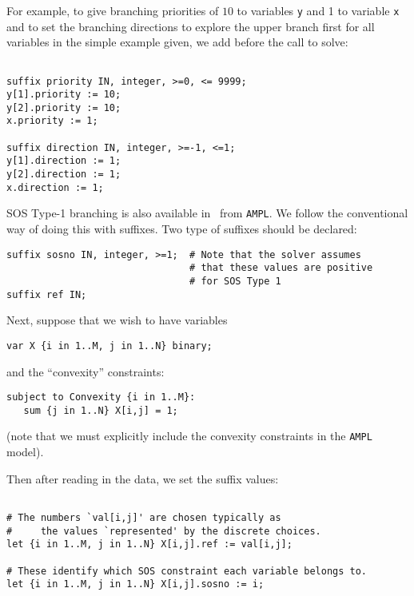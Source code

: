 For example, to give branching priorities of $10$ to variables {\tt y} and 1 to variable {\tt x}
and to set the branching directions to explore the upper branch first for all variables
in the simple example given, we add before the call to solve:
\begin{colorverb}
\begin{verbatim}

suffix priority IN, integer, >=0, <= 9999;
y[1].priority := 10;
y[2].priority := 10;
x.priority := 1;

suffix direction IN, integer, >=-1, <=1;
y[1].direction := 1;
y[2].direction := 1;
x.direction := 1;

\end{verbatim}
\end{colorverb}

SOS Type-1 branching is also available in \Bonmin\ from {\tt AMPL}. We
follow the conventional way of doing this with suffixes.
Two type of suffixes should be declared:

\begin{colorverb}
\begin{verbatim}
suffix sosno IN, integer, >=1;  # Note that the solver assumes
                                # that these values are positive
                                # for SOS Type 1
suffix ref IN;
\end{verbatim}
\end{colorverb}

Next, suppose that we wish to have variables

\begin{colorverb}
\begin{verbatim}
var X {i in 1..M, j in 1..N} binary;
\end{verbatim}
\end{colorverb}
and the ``convexity'' constraints:

\begin{colorverb}
\begin{verbatim}
subject to Convexity {i in 1..M}:
   sum {j in 1..N} X[i,j] = 1;
\end{verbatim}
\end{colorverb}

(note that we must explicitly include the convexity constraints in the {\tt AMPL} model).

Then after reading in the data, we set the suffix values:
\begin{colorverb}
\begin{verbatim}

# The numbers `val[i,j]' are chosen typically as
#     the values `represented' by the discrete choices.
let {i in 1..M, j in 1..N} X[i,j].ref := val[i,j];

# These identify which SOS constraint each variable belongs to.
let {i in 1..M, j in 1..N} X[i,j].sosno := i;
\end{verbatim}
\end{colorverb}

